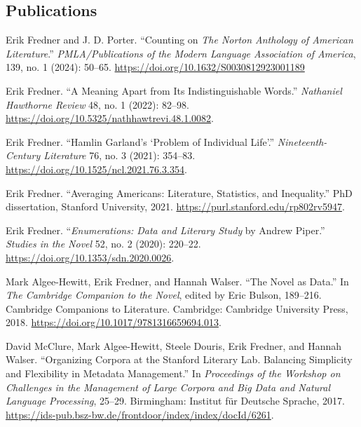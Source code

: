 \documentclass[
  12pt,
  letterpaper,
]{article}
\newlength{\cslhangindent}
\newlength{\cslentryspacingunit} %
\newenvironment{CSLReferences}[2] %
 {%
  \setlength{\parindent}{0pt}
  \ifodd #1
  \let\oldpar\par
  \def\par{\hangindent=\cslhangindent\oldpar}
  \fi
  \setlength{\parskip}{#2\cslentryspacingunit}
 }%
 {}
\begin{document}
\hypertarget{pubs}{%
\subsection{Publications}\label{pubs}}
\bigskip
\begin{CSLReferences}{1}{0}

\leavevmode{}%
Erik Fredner and J. D. Porter. {``Counting on {\emph{The Norton
Anthology of American Literature}}.''} \emph{PMLA/Publications of the Modern Language Association of America}, 139, no. 1 (2024): 50--65. \url{https://doi.org/10.1632/S0030812923001189}

\medskip

\leavevmode{}%
Erik Fredner. {``A {Meaning Apart} from {Its Indistinguishable
Words}.''} \emph{Nathaniel Hawthorne Review} 48, no. 1 (2022): 82--98.
\url{https://doi.org/10.5325/nathhawtrevi.48.1.0082}.

\medskip

\leavevmode{}%
Erik Fredner. {``Hamlin {Garland}'s {`{Problem} of {Individual Life}'}.''}
\emph{Nineteenth-Century Literature} 76, no. 3 (2021): 354--83.
\url{https://doi.org/10.1525/ncl.2021.76.3.354}.

\medskip

\leavevmode{}%
Erik Fredner. {``Averaging {Americans}: {Literature}, {Statistics}, and
{Inequality}.''} PhD dissertation, Stanford University, 2021.
\url{https://purl.stanford.edu/rp802rv5947}.

\medskip

\leavevmode{}%
Erik Fredner. {``\emph{Enumerations: {Data} and {Literary Study}} by {Andrew
Piper}.''} \emph{Studies in the Novel} 52, no. 2 (2020): 220--22.
\url{https://doi.org/10.1353/sdn.2020.0026}.

\medskip

\leavevmode{}%
Mark Algee-Hewitt, Erik Fredner, and Hannah Walser. {``The {Novel} as
{Data}.''} In \emph{The {Cambridge Companion} to the {Novel}}, edited by
Eric Bulson, 189--216. Cambridge {Companions} to {Literature}.
{Cambridge}: {Cambridge University Press}, 2018.
\url{https://doi.org/10.1017/9781316659694.013}.

\leavevmode{}%
David McClure, Mark Algee-Hewitt, Steele Douris, Erik Fredner, and
Hannah Walser. {``Organizing Corpora at the {Stanford Literary Lab}.
{Balancing} Simplicity and Flexibility in Metadata Management.''} In
\emph{Proceedings of the {Workshop} on {Challenges} in the {Management}
of {Large Corpora} and {Big Data} and {Natural Language Processing}},
25--29. {Birmingham}: {Institut für Deutsche Sprache}, 2017.
\url{https://ids-pub.bsz-bw.de/frontdoor/index/index/docId/6261}.

\end{CSLReferences}
\end{document}
